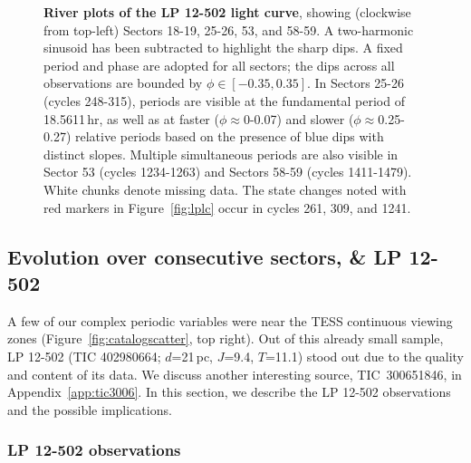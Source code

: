 \documentclass[11pt,twocolumn,tighten]{aastex63}
\begin{document}
\begin{figure*}[!t]
	\begin{center}
		\vspace{-0.2cm}
		
	\end{center}
	\vspace{-0.4cm}
	\caption{
    {\bf River plots of the LP 12-502 light curve}, showing (clockwise
    from top-left) Sectors 18-19, 25-26, 53, and 58-59.  A
    two-harmonic sinusoid has been subtracted to highlight the sharp
    dips.  
    A fixed period and phase are adopted for all sectors; the dips
    across all observations are bounded by $\phi \in [-0.35,0.35]$.
    In Sectors 25-26 (cycles 248-315), periods are visible at
    the fundamental period of 18.5611\,hr, as well as at faster
    ($\phi$$\approx$0-0.07) and slower ($\phi$$\approx$0.25-0.27)
    relative periods based on the presence of blue dips with distinct
    slopes.  Multiple simultaneous periods are also visible in Sector
    53 (cycles 1234-1263) and Sectors 58-59 (cycles 1411-1479).  White
    chunks denote missing data.
    The state changes noted with red markers in Figure~\ref{fig:lplc} occur in
    cycles 261, 309, and 1241.
	}
	\label{fig:lpriver0}
\end{figure*}


\subsection{Evolution over consecutive sectors, \& LP 12-502}

A few of our complex periodic variables were near the TESS continuous viewing
zones (Figure~\ref{fig:catalogscatter}, top right).  Out of this
already small sample, LP 12-502 (TIC 402980664; $d$=21\,pc, $J$=9.4,
$T$=11.1) stood out due to the quality and content of its data.  We
discuss another interesting source, TIC~300651846, in
Appendix~\ref{app:tic3006}.  In this section, we describe the LP
12-502 observations and the possible implications.


\subsubsection{LP 12-502 observations}
\label{subsec:lpobservations}
\end{document}
